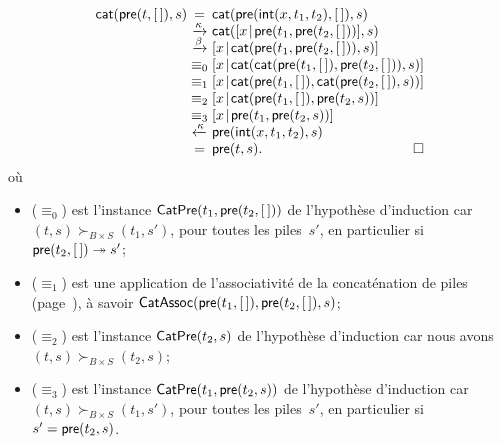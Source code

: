 \begin{equation*}
\begin{array}{r@{\;}c@{\;}l}
  \fun{cat}(\fun{pre}(t,\el),s)
& =
& \fun{cat}(\fun{pre}(\fun{int}(x,t_1,t_2),\el),s)\\
& \xrightarrow{\smash{\kappa}}
& \fun{cat}(\cons{x}{\fun{pre}(t_1,\fun{pre}(t_2,\el))},s)\\
& \xrightarrow{\smash{\beta}}
& \cons{x}{\fun{cat}(\fun{pre}(t_1,\fun{pre}(t_2,\el)),s)}\\
& \equiv_0
& \cons{x}{\fun{cat}(\fun{cat}(\fun{pre}(t_1,\el),\fun{pre}(t_2,\el)),s)}\\
& \equiv_1
& \cons{x}{\fun{cat}(\fun{pre}(t_1,\el),\fun{cat}(\fun{pre}(t_2,\el),s))}\\
& \equiv_2
& \cons{x}{\fun{cat}(\fun{pre}(t_1,\el),\fun{pre}(t_2,s))}\\
& \equiv_3
& \cons{x}{\fun{pre}(t_1,\fun{pre}(t_2,s))}\\
& \xleftarrow{\smash{\kappa}}
& \fun{pre}(\fun{int}(x,t_1,t_2),s)\\
& =
& \fun{pre}(t,s).\hfill\Box
\end{array}
\end{equation*}
où
\begin{itemize}

  \item (\(\equiv_0\)) est l'instance
  \(\textsf{CatPre}({t_1,\textsf{pre}(t_2,[\,])})\) de l'hypothèse d'induction
  car \((t,s) \succ_{B \times S} (t_1,s')\), pour toutes les
  piles~\(s'\), en particulier si \(\textsf{pre}(t_2,[\,])
  \twoheadrightarrow s'\);

  \item (\(\equiv_1\)) est une application de l'associativité de la
  concaténation de piles
  (page~\pageref{proof_assoc_cat}), à savoir
  \(\textsf{CatAssoc}({\textsf{pre}(t_1,[\,]),\textsf{pre}(t_2,[\,]),s})\);

  \item (\(\equiv_2\)) est l'instance
  \(\textsf{CatPre}({t_2,s})\) de
  l'hypothèse d'induction car nous avons \((t,s) \succ_{B \times S}
  (t_2,s)\);

  \item (\(\equiv_3\)) est l'instance \(\textsf{CatPre}({t_1,
    \textsf{pre}(t_2,s)})\) de l'hypothèse d'induction car \((t,s)
  \succ_{B \times S} (t_1,s')\), pour toutes les piles~\(s'\), en
  particulier si \(s' = \textsf{pre}(t_2,s)\).
\end{itemize}

